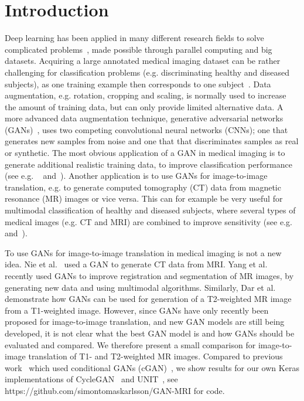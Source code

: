\documentclass{article}
\begin{document}
\section{Introduction}
Deep learning has been applied in many different research fields to solve complicated problems~\cite{LeCun2015}, made possible through parallel computing and big datasets. Acquiring a large annotated medical imaging dataset can be rather challenging for classification problems (e.g. discriminating healthy and diseased subjects), as one training example then corresponds to one subject~\cite{Litjens}. Data augmentation, e.g. rotation, cropping and scaling, is normally used to increase the amount of training data, but can only provide limited alternative data. A more advanced data augmentation technique, generative adversarial networks (GANs)~\cite{Goodfellow2014}, uses two competing convolutional neural networks (CNNs); one that generates new samples from noise and one that that discriminates samples as real or synthetic. The most obvious application of a GAN in medical imaging is to generate additional realistic training data, to improve classification performance (see e.g. ~\cite{Antoniou2017} and~\cite{Calimeri2017}). Another application is to use GANs for image-to-image translation, e.g. to generate computed tomography (CT) data from magnetic resonance (MR) images or vice versa. This can for example be very useful for multimodal classification of healthy and diseased subjects, where several types of medical images (e.g. CT and MRI) are combined to improve sensitivity (see e.g.~\cite{Dai2012} and~\cite{Zhang2011}). 

To use GANs for image-to-image translation in medical imaging is not a new idea. Nie et al.~\cite{Nie2016} used a GAN to generate CT data from MRI. Yang et al.~\cite{Yang2018} recently used GANs to improve registration and segmentation of MR images, by generating new data and using multimodal algorithms. Similarly, Dar et al.~ \cite{Hassan2018} demonstrate how GANs can be used for generation of a T2-weighted MR image from a T1-weighted image. However, since GANs have only recently been proposed for image-to-image translation, and new GAN models are still being developed, it is not clear what the best GAN model is and how GANs should be evaluated and compared. We therefore present a small comparison for image-to-image translation of T1- and T2-weighted MR images. Compared to previous work~\cite{Yang2018,Hassan2018} which used conditional GANs (cGAN)~\cite{isola2016image}, we show results for our own Keras implementations of CycleGAN~\cite{cycleGANs} and UNIT~\cite{VAECoupledGANs}, see https://github.com/simontomaskarlsson/GAN-MRI for code.
\end{document}
